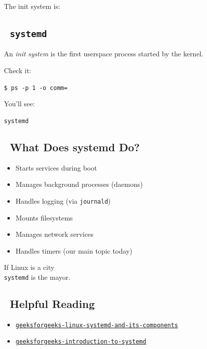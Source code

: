 \documentclass[12pt]{article}
\newcommand{\bookicon}{\faBook}
\begin{document}
The init system is:

\subsection*{\faBrain\ \texttt{systemd}}

An \textit{init system} is the first userspace process started by the kernel.

Check it:

\begin{highlightbox}
\texttt{\$ ps -p 1 -o comm=}
\end{highlightbox}

You'll see:

\begin{highlightbox}
\texttt{systemd}
\end{highlightbox}

\subsection*{\faQuestionCircle\ What Does systemd Do?}

\begin{itemize}
    \item Starts services during boot
    \item Manages background processes (daemons)
    \item Handles logging (via \texttt{journald})
    \item Mounts filesystems
    \item Manages network services
    \item Handles timers (our main topic today)
\end{itemize}

\begin{infobox}
If Linux is a city \faCity\\
\texttt{systemd} is the mayor.
\end{infobox}

\subsection*{\bookicon\ Helpful Reading}

\begin{itemize}
    \item \href{https://www.geeksforgeeks.org/linux-unix/linux-systemd-and-its-components/}{\texttt{geeksforgeeks-linux-systemd-and-its-components}}
    \item \href{https://www.geeksforgeeks.org/linux-unix/an-introduction-to-systemd-and-its-role-in-the-boot-process/}{\texttt{geeksforgeeks-introduction-to-systemd}}
\end{itemize}
\end{document}
